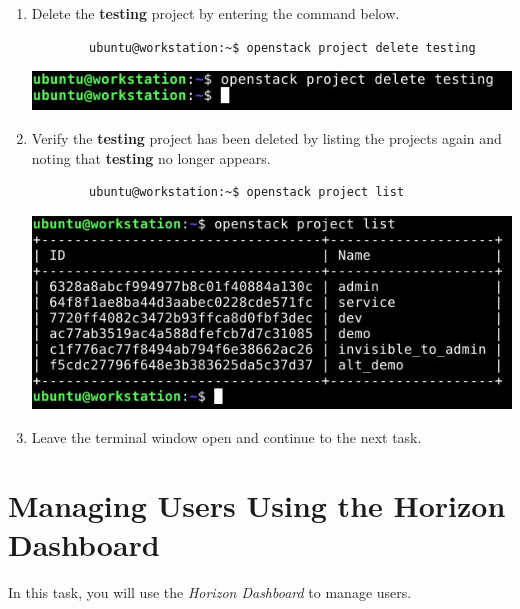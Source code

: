 \documentclass[letterpaper, 12pt]{article}
\begin{document}
\begin{enumerate}
    \item Delete the \textbf{testing} project by entering the command below.
    \begin{lstlisting}
        ubuntu@workstation:~$ openstack project delete testing
    \end{lstlisting}

    \begin{center}
        \includegraphics[width=\linewidth]{images/part2/step6.png}
    \end{center}

    \item Verify the \textbf{testing} project has been deleted by listing the projects again and noting that
    \textbf{testing} no longer appears.
    \begin{lstlisting}
        ubuntu@workstation:~$ openstack project list
    \end{lstlisting}

    \begin{center}
        \includegraphics[width=\linewidth]{images/part2/step7.png}
    \end{center}

    \item Leave the terminal window open and continue to the next task.
\end{enumerate}

\section{Managing Users Using the Horizon Dashboard}
\label{sec:managing_users_using_the_horizon_dashboard}
In this task, you will use the \textit{Horizon Dashboard} to manage users.
\end{document}
